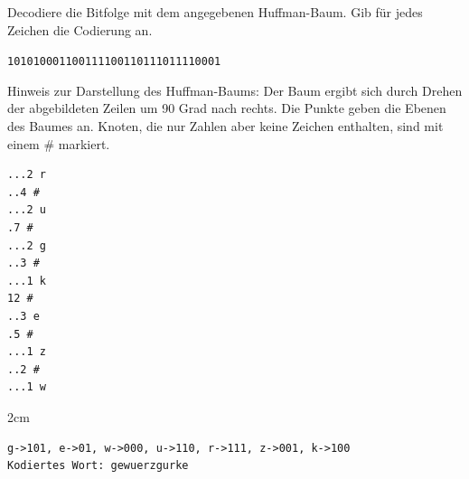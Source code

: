 \question[2]
Decodiere die Bitfolge mit dem angegebenen Huffman-Baum. Gib für jedes Zeichen die Codierung an.

\texttt{101010001100111100110111011110001}

Hinweis zur Darstellung des Huffman-Baums: Der Baum ergibt sich durch
Drehen der abgebildeten Zeilen um 90 Grad nach rechts. Die Punkte
geben die Ebenen des Baumes an. Knoten, die nur Zahlen aber keine
Zeichen enthalten, sind mit einem \# markiert.
\begin{lstlisting}
...2 r
..4 #
...2 u
.7 #
...2 g
..3 #
...1 k
12 #
..3 e
.5 #
...1 z
..2 #
...1 w
\end{lstlisting}
\begin{solutionbox}{2cm}
\begin{lstlisting}
g->101, e->01, w->000, u->110, r->111, z->001, k->100
Kodiertes Wort: gewuerzgurke
\end{lstlisting}
\end{solutionbox}
